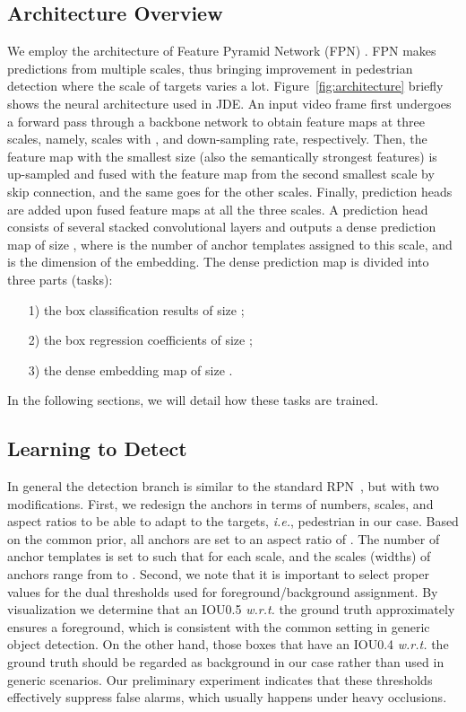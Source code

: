 \documentclass[runningheads]{llncs}
\def\ie{\textit{i.e.}}
\def\wrt{\textit{w.r.t. }}
\begin{document}
\subsection{Architecture Overview}
We employ the architecture of Feature Pyramid Network (FPN) \cite{fpn}. FPN makes predictions from multiple scales, thus bringing improvement in pedestrian detection where the scale of targets varies a lot. Figure~\ref{fig:architecture} briefly shows the neural architecture used in JDE. 
An input video frame first undergoes a forward pass through a backbone network to obtain feature maps at three scales, namely, scales with ,  and  down-sampling rate, respectively. Then, the feature map with the smallest size (also the semantically strongest features) is up-sampled and fused with the feature map from the second smallest scale by skip connection, and the same goes for the other scales. Finally, prediction heads are added upon fused feature maps at all the three scales. A prediction head consists of several stacked convolutional layers and outputs a dense prediction map of size , where  is the number of anchor templates assigned to this scale, and  is the dimension of the embedding. The dense prediction map is divided into three parts (tasks):
\begin{itemize}
    \item[1)] the box classification results of size ;
    \item[2)] the box regression coefficients of size ; 
    \item[3)] the dense embedding map of size .
\end{itemize}

In the following sections, we will detail how these tasks are trained.

\subsection{Learning to Detect}
In general the detection branch is similar to the standard RPN~\cite{faster}, but with two modifications. First, we redesign the anchors in terms of numbers, scales, and aspect ratios to be able to adapt to the targets, \ie, pedestrian in our case. Based on the common prior, all anchors are set to an aspect ratio of . The number of anchor templates is set to  such that  for each scale, and the scales (widths) of anchors range from  to .
Second, we note that it is important to select proper values for the dual thresholds used for  foreground/background assignment. By visualization we determine that an IOU0.5 \wrt the ground truth approximately ensures a foreground, which is consistent with the common setting in generic object detection. On the other hand, those boxes that have an IOU0.4 \wrt the ground truth should be regarded as background in our case rather than  used in generic scenarios.
Our preliminary experiment indicates that these thresholds effectively suppress false alarms, which usually happens under heavy occlusions. 
\end{document}
